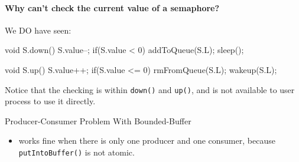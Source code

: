 \paragraph{Why can't check the current value of a semaphore?}

We DO have seen:
  
\begin{minipage}{.4\linewidth}
  \begin{ccode}
void S.down(){
  S.value--;
  if(S.value < 0){
    addToQueue(S.L);
    sleep();
  }
}      
\end{ccode}
\end{minipage}
\qquad
\begin{minipage}{.4\linewidth}
  \begin{ccode}
void S.up(){
  S.value++;
  if(S.value <= 0){
    rmFromQueue(S.L);
    wakeup(S.L);
  }
}    
  \end{ccode}
\end{minipage}

Notice that the checking is within \texttt{down()} and \texttt{up()}, and is not available to
user process to use it directly.

\begin{frame}{Producer-Consumer Problem With Bounded-Buffer}
  \begin{center}
     
  \end{center}
  \pause
  \begin{itemize}
  \item[] works fine when there is only one producer and one consumer, because
      \texttt{putIntoBuffer()} is not atomic.
  \end{itemize}
\end{frame}


